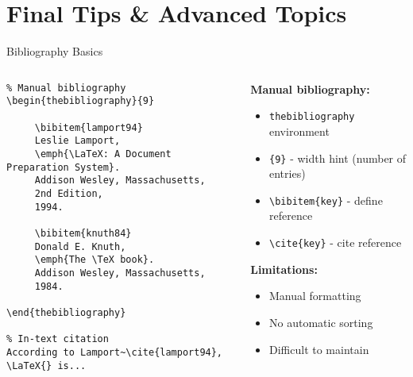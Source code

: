 
\section{Final Tips \& Advanced Topics}

\begin{frame}[fragile]{Bibliography Basics}
     \begin{columns}
          \begin{column}{0.5\textwidth}
               \begin{lstlisting}
% Manual bibliography
\begin{thebibliography}{9}
     
     \bibitem{lamport94}
     Leslie Lamport,
     \emph{\LaTeX: A Document Preparation System}.
     Addison Wesley, Massachusetts,
     2nd Edition,
     1994.
     
     \bibitem{knuth84}
     Donald E. Knuth,
     \emph{The \TeX book}.
     Addison Wesley, Massachusetts,
     1984.
     
\end{thebibliography}

% In-text citation
According to Lamport~\cite{lamport94},
\LaTeX{} is...
               \end{lstlisting}
          \end{column}
          
          \begin{column}{0.5\textwidth}
               \textbf{Manual bibliography:}
               \begin{itemize}
                    \item \texttt{thebibliography} environment
                    \item \texttt{\{9\}} - width hint (number of entries)
                    \item \texttt{\textbackslash bibitem\{key\}} - define reference
                    \item \texttt{\textbackslash cite\{key\}} - cite reference
               \end{itemize}
               
               \textbf{Limitations:}
               \begin{itemize}
                    \item Manual formatting
                    \item No automatic sorting
                    \item Difficult to maintain
               \end{itemize}
               

\end{column}
\end{columns}
\end{frame}
